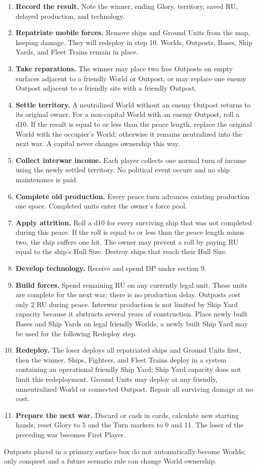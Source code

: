 \begin{enumerate}
  \item \textbf{Record the result.} Note the winner, ending Glory, territory,
    saved RU, delayed production, and technology.
  \item \textbf{Repatriate mobile forces.} Remove ships and Ground Units from
    the map, keeping damage. They will redeploy in step 10. Worlds, Outposts,
    Bases, Ship Yards, and Fleet Trains remain in place.
  \item \textbf{Take reparations.} The winner may place two free Outposts on
    empty surfaces adjacent to a friendly World or Outpost, or may replace one
    enemy Outpost adjacent to a friendly site with a friendly Outpost.
  \item \textbf{Settle territory.} A neutralized World without an enemy Outpost
    returns to its original owner. For a non-capital World with an enemy
    Outpost, roll a d10. If the result is equal to or less than the peace
    length, replace the original World with the occupier's World; otherwise it
    remains neutralized into the next war. A capital never changes ownership
    this way.
  \item \textbf{Collect interwar income.} Each player collects one normal turn
    of income using the newly settled territory. No political event occurs and
    no ship maintenance is paid.
  \item \textbf{Complete old production.} Every peace turn advances existing
    production one space. Completed units enter the owner's force pool.
  \item \textbf{Apply attrition.} Roll a d10 for every surviving ship that was
    not completed during this peace. If the roll is equal to or less than the
    peace length minus two, the ship suffers one hit. The owner may prevent a
    roll by paying RU equal to the ship's Hull Size. Destroy ships that reach
    their Hull Size.
  \item \textbf{Develop technology.} Receive and spend DP under section 9.
  \item \textbf{Build forces.} Spend remaining RU on any currently legal unit.
    These units are complete for the next war; there is no production delay.
    Outposts cost only 2 RU during peace. Interwar production is not limited by
    Ship Yard capacity because it abstracts several years of construction.
    Place newly built Bases and Ship Yards on legal friendly Worlds; a newly
    built Ship Yard may be used for the following Redeploy step.
  \item \textbf{Redeploy.} The loser deploys all repatriated ships and Ground
    Units first, then the winner. Ships, Fighters, and Fleet Trains deploy in a
    system containing an operational friendly Ship Yard; Ship Yard capacity
    does not limit this redeployment. Ground Units may deploy at any friendly,
    unneutralized World or connected Outpost. Repair all surviving damage at
    no cost.
  \item \textbf{Prepare the next war.} Discard or cash in cards, calculate new
    starting hands, reset Glory to 5 and the Turn markers to 0 and 11. The loser
    of the preceding war becomes First Player.
\end{enumerate}

Outposts placed in a primary surface box do not automatically become Worlds;
only conquest and a future scenario rule can change World ownership.
